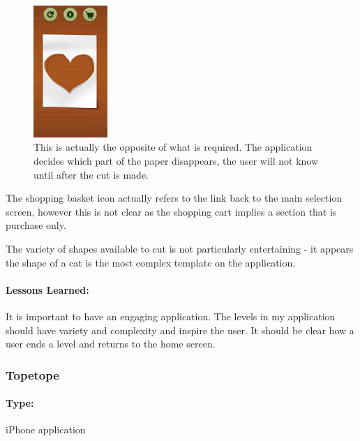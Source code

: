 \documentclass[11pt]{article}
\begin{document}
                 \begin{figure}
                \includegraphics[width=0.25\textwidth]{Images/paperCutCraftReveal.png}
                    \caption{This is actually the opposite of what is required. The application decides which part of the paper disappears, the user will not know until after the cut is made.}
                    \label{fig:paperCutCraftReveal}
                \end{figure}
                
                The shopping basket icon actually refers to the link back to the main selection screen, however this is not clear as the shopping cart implies a section that is purchase only. 
                
                The variety of shapes available to cut is not particularly entertaining - it appears the shape of a cat is the most complex template on the application.
                
                \paragraph{Lessons Learned:}
                
                It is important to have an engaging application. The levels in my application should have variety and complexity and inspire the user. It should be clear how a user ends a level and returns to the home screen.
                
                \subsubsection{Topetope}
                 
                \paragraph{Type:} iPhone application \cite{TopeTope}
\end{document}
